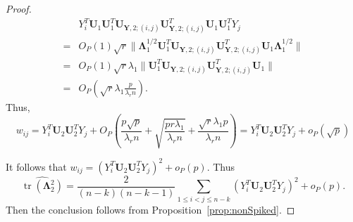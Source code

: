 \documentclass[12pt]{article} %
\DeclareMathOperator{\mytr}{tr}
\newcommand{\bY}{\mathbf{Y}}
\newcommand{\bU}{\mathbf{U}}
\newcommand{\bfsym}[1]{\ensuremath{\boldsymbol{#1}}}
\def\bLambda {\bfsym {\Lambda}}
\theoremstyle{definition}
\begin{document}
\begin{proof}
$$
\begin{aligned}
&Y_i^T \bU_1 \bU_1^T \bU_{\bY,2;(i,j)} \bU_{\bY,2;(i,j)}^T \bU_1 \bU_1^T Y_j\\
=
    &O_P(1)\sqrt{r}\|\bLambda_1^{1/2}\bU_1^T \bU_{\bY,2;(i,j)}\bU_{\bY,2;(i,j)}^T \bU_1 \bLambda_1^{1/2}\|\\
    =
    &O_P(1)\sqrt{r}\lambda_1\|\bU_1^T \bU_{\bY,2;(i,j)}\bU_{\bY,2;(i,j)}^T \bU_1\|\\
    =
    &O_P(\sqrt{r}\lambda_1 \frac{p}{\lambda_r n}).
\end{aligned}
$$
Thus, 
$$
    w_{ij}=Y_i^T \bU_2 \bU_2^T Y_j+O_P(\frac{p\sqrt{p}}{\lambda_r n}+\sqrt{\frac{pr\lambda_1}{\lambda_r n}}+\frac{\sqrt{r}\lambda_1 p}{\lambda_r n})=Y_i^T \bU_2 \bU_2^T Y_j+o_P(\sqrt{p})
$$

It follows that $w_{ij}=(Y_i^T \bU_2 \bU_2^T Y_j)^2+o_P(p)$. Thus
$$
    \widehat{\mytr(\bLambda_2^2)}=\frac{2}{(n-k)(n-k-1)}\sum_{1\leq i<j\leq n-k}(Y_i^T \bU_2 \bU_2^T Y_j)^2+o_P(p).
$$
    Then the conclusion follows from Proposition~\ref{prop:nonSpiked}.
\end{proof}
\end{document}
